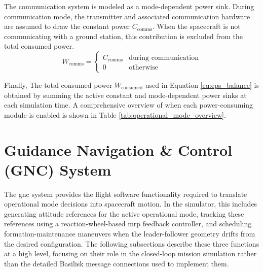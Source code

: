 The communication system is modeled as a mode-dependent power sink. During communication mode, the transmitter and associated communication hardware are assumed to draw the constant power $C_{\mathrm{comms}}$. When the spacecraft is not communicating with a ground station, this contribution is excluded from the total consumed power.
\begin{equation}
    W_{\mathrm{comms}} = \begin{cases}
        C_{\mathrm{comms}} & \text{during communication}\\
        0 \quad & \text{otherwise}
    \end{cases} 
\end{equation}


Finally, The total consumed power $W_{\mathrm{consumed}}$ used in Equation \ref{eq:eps_balance} is obtained by summing the active constant and mode-dependent power sinks at each simulation time. A comprehensive overview of when each power-consuming module is enabled is shown in Table \ref{tab:operational_mode_overview}. 








\section{Guidance Navigation \& Control (GNC) System}
The \gls{gnc} system provides the flight software functionality required to translate operational mode decisions into spacecraft motion. In the simulator, this includes generating attitude references for the active operational mode, tracking these references using a reaction-wheel-based \gls{mrp} feedback controller, and scheduling formation-maintenance maneuvers when the leader-follower geometry drifts from the desired configuration. The following subsections describe these three functions at a high level, focusing on their role in the closed-loop mission simulation rather than the detailed Basilisk message connections used to implement them.


